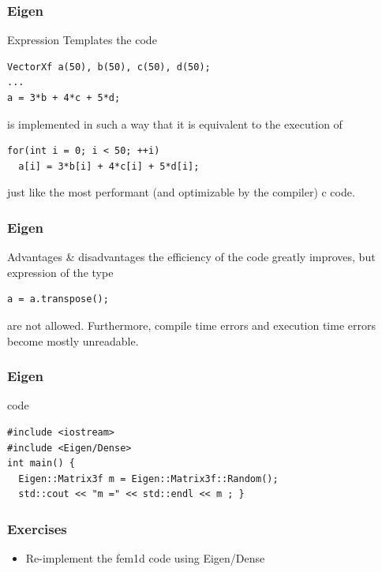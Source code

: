 \documentclass[smaller,a4paper]{beamer}
\begin{document}

\begin{frame}[fragile]

    \frametitle{Eigen}

    \begin{block}{Expression Templates}
        the code
        \begin{lstlisting}
VectorXf a(50), b(50), c(50), d(50);
...
a = 3*b + 4*c + 5*d;
        \end{lstlisting}
        is implemented in such a way that it is equivalent to the execution of
        \begin{lstlisting}
for(int i = 0; i < 50; ++i)
  a[i] = 3*b[i] + 4*c[i] + 5*d[i];
        \end{lstlisting}
        just like the most performant (and optimizable by the compiler) c code.
    \end{block}

\end{frame}


\begin{frame}[fragile]

    \frametitle{Eigen}

    \begin{block}{Advantages \& disadvantages}
        the efficiency of the code greatly improves, but expression of the type
        \begin{lstlisting}
a = a.transpose();
        \end{lstlisting}
        are not allowed. Furthermore, compile time errors and execution time
        errors become mostly unreadable.
    \end{block}

\end{frame}

\begin{frame}[fragile]

    \frametitle{Eigen}

    \begin{block}{code}
        \begin{lstlisting}
#include <iostream>
#include <Eigen/Dense>
int main() {
  Eigen::Matrix3f m = Eigen::Matrix3f::Random();
  std::cout << "m =" << std::endl << m ; }
        \end{lstlisting}
    \end{block}


\end{frame}

\begin{frame}\frametitle{Exercises}
\begin{itemize}
\item Re-implement the fem1d code using Eigen/Dense
\end{itemize}
\end{frame}
\end{document}
